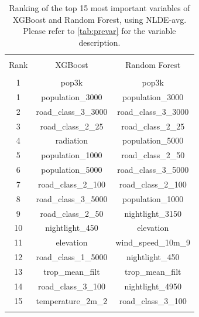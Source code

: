 \documentclass{article}
\begin{document}
\begin{table}[H] \centering 
  \caption{Ranking of the top 15 most important variables of XGBoost and Random Forest, using NLDE-avg. Please refer to  \cref{tab:prevar} for the variable description.} 
    \label{nlde_vimp} 
\begin{tabular}{@{\extracolsep{5pt}} ccc} 
\\[-1.8ex]\hline 
\hline \\[-1.8ex] 
Rank & XGBoost & Random Forest \\ 
\hline \\[-1.8ex] 
1 & pop3k & pop3k \\ 
1 & population\_3000 & population\_3000 \\ 
2 & road\_class\_3\_3000 & road\_class\_3\_3000 \\ 
3 & road\_class\_2\_25 & road\_class\_2\_25 \\ 
4 & radiation & population\_5000 \\ 
5 & population\_1000 & road\_class\_2\_50 \\ 
6 & population\_5000 & road\_class\_3\_5000 \\ 
7 & road\_class\_2\_100 & road\_class\_2\_100 \\ 
8 & road\_class\_3\_5000 & population\_1000 \\ 
9 & road\_class\_2\_50 & nightlight\_3150 \\ 
10 & nightlight\_450 & elevation \\ 
11 & elevation & wind\_speed\_10m\_9 \\ 
12 & road\_class\_1\_5000 & nightlight\_450 \\ 
13 & trop\_mean\_filt & trop\_mean\_filt \\ 
14 & road\_class\_3\_100 & nightlight\_4950 \\ 
15 & temperature\_2m\_2 & road\_class\_3\_100 \\ 

\hline \\[-1.8ex] 
\end{tabular} 
\end{table} 
\end{document}
